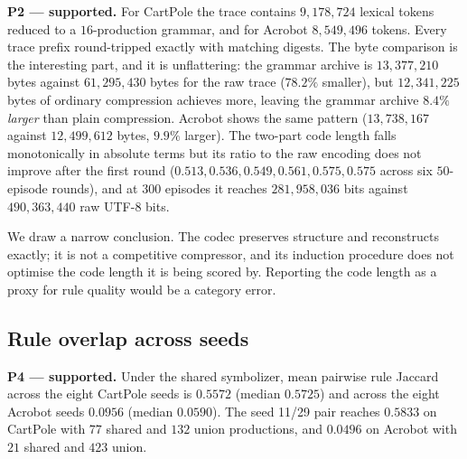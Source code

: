 \documentclass[11pt,a4paper]{article}
\begin{document}
\textbf{P2 --- supported.} For CartPole the trace contains $9{,}178{,}724$ lexical tokens reduced to a $16$-production grammar, and for Acrobot $8{,}549{,}496$ tokens. Every trace prefix round-tripped exactly with matching digests. The byte comparison is the interesting part, and it is unflattering: the grammar archive is $13{,}377{,}210$ bytes against $61{,}295{,}430$ bytes for the raw trace ($78.2\%$ smaller), but $12{,}341{,}225$ bytes of ordinary compression achieves more, leaving the grammar archive $8.4\%$ \emph{larger} than plain compression. Acrobot shows the same pattern ($13{,}738{,}167$ against $12{,}499{,}612$ bytes, $9.9\%$ larger). The two-part code length falls monotonically in absolute terms but its ratio to the raw encoding does not improve after the first round ($0.513, 0.536, 0.549, 0.561, 0.575, 0.575$ across six $50$-episode rounds), and at $300$ episodes it reaches $281{,}958{,}036$ bits against $490{,}363{,}440$ raw UTF-8 bits.

We draw a narrow conclusion. The codec preserves structure and reconstructs exactly; it is not a competitive compressor, and its induction procedure does not optimise the code length it is being scored by. Reporting the code length as a proxy for rule quality would be a category error.

\subsection{Rule overlap across seeds}
\label{sec:res-overlap}

\textbf{P4 --- supported.} Under the shared symbolizer, mean pairwise rule Jaccard across the eight CartPole seeds is $0.5572$ (median $0.5725$) and across the eight Acrobot seeds $0.0956$ (median $0.0590$). The seed 11/29 pair reaches $0.5833$ on CartPole with $77$ shared and $132$ union productions, and $0.0496$ on Acrobot with $21$ shared and $423$ union.
\end{document}
